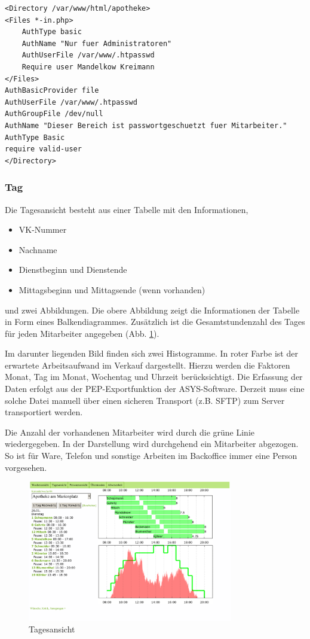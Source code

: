 \documentclass[10pt,a4paper,titlepage,oneside]{article}
\begin{document}
\begin{verbatim}
<Directory /var/www/html/apotheke>
<Files *-in.php>
    AuthType basic
    AuthName "Nur fuer Administratoren"
    AuthUserFile /var/www/.htpasswd
    Require user Mandelkow Kreimann
</Files>
AuthBasicProvider file
AuthUserFile /var/www/.htpasswd
AuthGroupFile /dev/null
AuthName "Dieser Bereich ist passwortgeschuetzt fuer Mitarbeiter."
AuthType Basic
require valid-user
</Directory>
\end{verbatim}





\subsubsection{Tag}
Die Tagesansicht besteht aus einer Tabelle mit den Informationen,
\begin{itemize}
	\item VK-Nummer
	\item Nachname
	\item Dienstbeginn und Dienstende
	\item Mittagsbeginn und Mittagsende (wenn vorhanden)
\end{itemize}
und zwei Abbildungen. Die obere Abbildung zeigt die Informationen der Tabelle in Form eines Balkendiagrammes. Zusätzlich ist die Gesamtstundenzahl des Tages für jeden Mitarbeiter angegeben (Abb. \ref{fig:Tagesansicht}).

Im darunter liegenden Bild finden sich zwei Histogramme. In roter Farbe ist der erwartete Arbeitsaufwand im Verkauf dargestellt. Hierzu werden die Faktoren Monat, Tag im Monat, Wochentag und Uhrzeit berücksichtigt. Die Erfassung der Daten erfolgt aus der PEP-Exportfunktion der ASYS-Software. Derzeit muss eine solche Datei manuell über einen sicheren Transport (z.B. SFTP) zum Server transportiert werden.

Die Anzahl der vorhandenen Mitarbeiter wird durch die grüne Linie wiedergegeben. In der Darstellung wird durchgehend ein Mitarbeiter abgezogen. So ist für Ware, Telefon und sonstige Arbeiten im Backoffice immer eine Person vorgesehen.
\begin{figure}[h]
\centering
\includegraphics[width=0.8\textwidth]{tag-out}
\caption{Tagesansicht}
\label{fig:Tagesansicht}
\end{figure}
\end{document}

